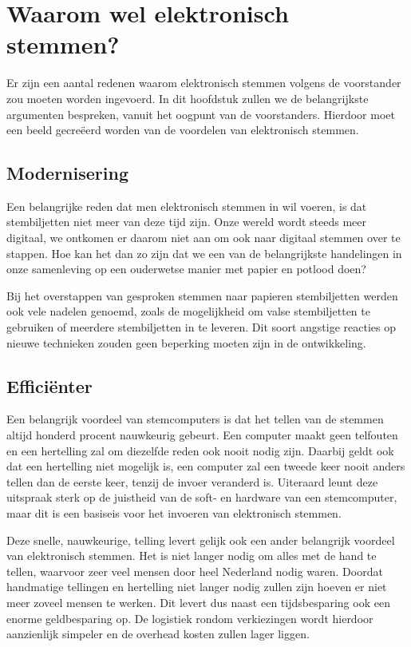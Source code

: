 \documentclass[a4paper]{article}
\begin{document}
\newpage

\section{Waarom wel elektronisch stemmen?}
\label{text:voor}
Er zijn een aantal redenen waarom elektronisch stemmen volgens de voorstander zou moeten worden ingevoerd.
In dit hoofdstuk zullen we de belangrijkste argumenten bespreken, vanuit het oogpunt van de voorstanders.
Hierdoor moet een beeld gecre{\"e}erd worden van de voordelen van elektronisch stemmen.

\subsection{Modernisering}
Een belangrijke reden dat men elektronisch stemmen in wil voeren, is dat stembiljetten niet meer van deze tijd zijn.
Onze wereld wordt steeds meer digitaal, we ontkomen er daarom niet aan om ook naar digitaal stemmen over te stappen.
Hoe kan het dan zo zijn dat we een van de belangrijkste handelingen in onze samenleving op een ouderwetse manier met papier en potlood doen?

Bij het overstappen van gesproken stemmen naar papieren stembiljetten werden ook vele nadelen genoemd, zoals de mogelijkheid om valse stembiljetten te gebruiken of meerdere stembiljetten in te leveren.
Dit soort angstige reacties op nieuwe technieken zouden geen beperking moeten zijn in de ontwikkeling.

\subsection{Effici{\"e}nter}
Een belangrijk voordeel van stemcomputers is dat het tellen van de stemmen altijd honderd procent nauwkeurig gebeurt.
Een computer maakt geen telfouten en een hertelling zal om diezelfde reden ook nooit nodig zijn.
Daarbij geldt ook dat een hertelling niet mogelijk is, een computer zal een tweede keer nooit anders tellen dan de eerste keer, tenzij de invoer veranderd is.
Uiteraard leunt deze uitspraak sterk op de juistheid van de soft- en hardware van een stemcomputer, maar dit is een basiseis voor het invoeren van elektronisch stemmen.

Deze snelle, nauwkeurige, telling levert gelijk ook een ander belangrijk voordeel van elektronisch stemmen.
Het is niet langer nodig om alles met de hand te tellen, waarvoor zeer veel mensen door heel Nederland nodig waren.
Doordat handmatige tellingen en hertelling niet langer nodig zullen zijn hoeven er niet meer zoveel mensen te werken.
Dit levert dus naast een tijdsbesparing ook een enorme geldbesparing op.
De logistiek rondom verkiezingen wordt hierdoor aanzienlijk simpeler en de overhead kosten zullen lager liggen.
\end{document}
